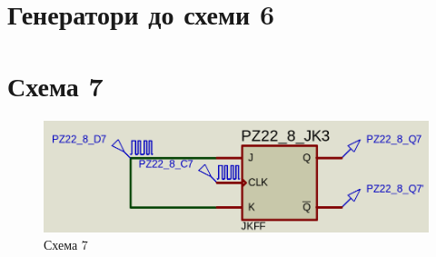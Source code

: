 \documentclass{article}
\begin{document}
\begin{normalsize}
	\section*{Генератори до схеми 6}
	\begin{figure}[H]
		\centering
		\hspace{5px}
	\end{figure}

	\section*{Схема 7}	
	\begin{figure}[H]
		\centering
		\includegraphics[scale=0.25]{s7}	
		\caption{Схема 7}
	\end{figure}
	

\end{normalsize}
\end{document}
